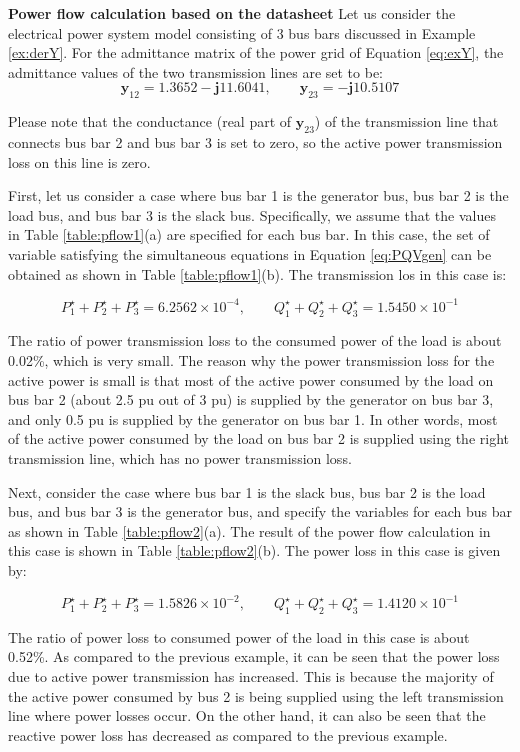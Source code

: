 \documentclass[graybox, envcountchap]{svmult}
\begin{document}
\begin{example}{\textbf{\textbf{Power flow calculation based on the datasheet}}}\label{ex:pf3bus}
Let us consider the electrical power system model consisting of 3 bus bars
discussed in Example \ref{ex:derY}. For the admittance matrix of the power grid
of Equation \ref{eq:exY}, the admittance values of the two transmission lines
are set to be:
\begin{equation}\label{eq:rightlossless}
  \bm{y}_{12} = 1.3652 - \bm{j} 11.6041, \qquad
  \bm{y}_{23} =  - \bm{j} 10.5107
\end{equation}

Please note that the conductance (real part of $\bm{y}_{23}$) of the
transmission line that connects bus bar 2 and bus bar 3 is set to zero, so the
active power transmission loss on this line is zero.

First, let us consider a case where bus bar 1 is the generator bus, bus bar 2 is
the load bus, and bus bar 3 is the slack bus.  Specifically, we assume that the
values in Table \ref{table:pflow1}(a) are specified for each bus bar.  In this
case, the set of variable satisfying the simultaneous equations in Equation
\ref{eq:PQVgen} can be obtained as shown in Table \ref{table:pflow1}(b). The
transmission los in this case is:

\[
  P_1^{\star} + P_2^{\star} + P_3^{\star} = 6.2562\times 10^{-4},
  \qquad 
  Q_1^{\star} + Q_2^{\star} + Q_3^{\star} =1.5450  \times 10^{-1}
\]

The ratio of power transmission loss to the consumed power of the load is about
0.02\%, which is very small. The reason why the power transmission loss for the
active power is small is that most of the active power consumed by the load on
bus bar 2 (about 2.5 pu out of 3 pu) is supplied by the generator on bus bar 3,
and only 0.5 pu is supplied by the generator on bus bar 1. In other words, most
of the active power consumed by the load on bus bar 2 is supplied using the right
transmission line, which has no power transmission loss.

Next, consider the case where bus bar 1 is the slack bus, bus bar 2 is the load
bus, and bus bar 3 is the generator bus, and specify the variables for each bus
bar as shown in Table \ref{table:pflow2}(a). The result of the power flow
calculation in this case is shown in Table \ref{table:pflow2}(b). The power loss in
this case is given by:

\[
  P_1^{\star} + P_2^{\star} + P_3^{\star} = 1.5826 \times 10^{-2},
  \qquad 
  Q_1^{\star} + Q_2^{\star} + Q_3^{\star} =1.4120  \times 10^{-1}
\]

The ratio of power loss to consumed power of the load in this case is about
0.52\%. As compared to the previous example, it can be seen that the power loss
due to active power transmission has increased. This is because the majority of
the active power consumed by bus 2 is being supplied using the left transmission
line where power losses occur. On the other hand, it can also be seen that the
reactive power loss has decreased as compared to the previous example.
\end{example}
\end{document}
